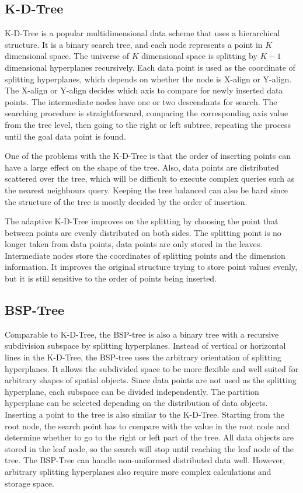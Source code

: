 \subsection{K-D-Tree}
K-D-Tree \cite{Bentley:1975gn} is a popular multidimensional data scheme that uses a hierarchical structure. It is a binary search tree, and each node represents a point in ${K}$ dimensional space. The universe of ${K}$ dimensional space is splitting by ${K-1}$ dimensional hyperplanes recursively. Each data point is used as the coordinate of splitting hyperplanes, which depends on whether the node is X-align or Y-align. The X-align or Y-align decides which axis to compare for newly inserted data points. The intermediate nodes have one or two descendants for search. The searching procedure is straightforward, comparing the corresponding axis value from the tree level, then going to the right or left subtree, repeating the process until the goal data point is found. 

One of the problems with the K-D-Tree is that the order of inserting points can have a large effect on the shape of the tree. Also, data points are distributed scattered over the tree, which will be difficult to execute complex queries such as the nearest neighbours query. Keeping the tree balanced can also be hard since the structure of the tree is mostly decided by the order of insertion. 

The adaptive K-D-Tree \cite{Bentley:1975gn} improves on the splitting by choosing the point that between points are evenly distributed on both sides. The splitting point is no longer taken from data points, data points are only stored in the leaves. Intermediate nodes store the coordinates of splitting points and the dimension information. It improves the original structure trying to store point values evenly, but it is still sensitive to the order of points being inserted. 


\subsection{BSP-Tree}
Comparable to K-D-Tree, the BSP-tree \cite{Fuchs:1980bj} is also a binary tree with a recursive subdivision subspace by splitting hyperplanes. Instead of vertical or horizontal lines in the K-D-Tree, the BSP-tree uses the arbitrary orientation of splitting hyperplanes. It allows the subdivided space to be more flexible and well suited for arbitrary shapes of spatial objects. Since data points are not used as the splitting hyperplane, each subspace can be divided independently. The partition hyperplane can be selected depending on the distribution of data objects. 
Inserting a point to the tree is also similar to the K-D-Tree. Starting from the root node, the search point has to compare with the value in the root node and determine whether to go to the right or left part of the tree. All data objects are stored in the leaf node, so the search will stop until reaching the leaf node of the tree. 
The BSP-Tree can handle non-uniformed distributed data well. However, arbitrary splitting hyperplanes also require more complex calculations and storage space. 



